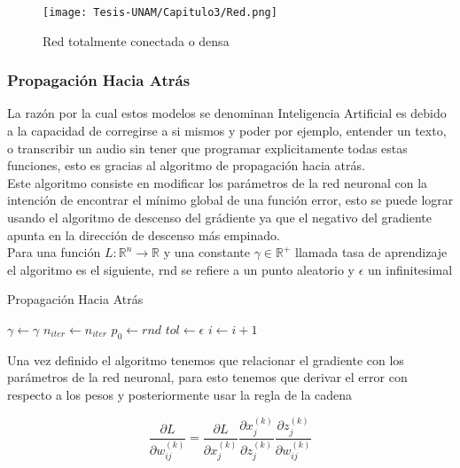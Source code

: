 \begin{figure}
    \centering
    \texttt{[image: Tesis-UNAM/Capitulo3/Red.png]}
    \caption{Red totalmente conectada o densa}
    \label{fig:enter-label}
\end{figure}

\subsubsection{Propagación Hacia Atrás}
La razón por la cual estos modelos se denominan Inteligencia Artificial es debido a la capacidad de corregirse a si mismos y poder por ejemplo, entender un texto, o transcribir un audio sin tener que programar explicitamente todas estas funciones, esto es gracias al algoritmo de propagación hacia atrás.\\

Este algoritmo consiste en modificar los parámetros de la red neuronal con la intención de encontrar el mínimo global de una función error, esto se puede lograr usando el algoritmo de descenso del grádiente ya que el negativo del gradiente apunta en la dirección de descenso más empinado.\\

Para una función $L:\mathbb{R}^n\xrightarrow{} \mathbb{R}$ y una constante $\gamma \in \mathbb{R}^+$ llamada tasa de aprendizaje el algoritmo es el siguiente, rnd se refiere a un punto aleatorio y $\epsilon$ un infinitesimal

\begin{algorithm}
    \caption{Propagación Hacia Atrás}\label{alg:cap}
    \begin{algorithmic}
    \State $\gamma \gets \gamma$
    \State $n_{iter} \gets n_{iter}$
    \State $p_0 \gets rnd$
    \State $tol \gets \epsilon$
        \State $i \gets i+1$
        \EndIf
        \EndWhile
    \end{algorithmic}
\end{algorithm}

Una vez definido el algoritmo tenemos que relacionar el gradiente con los parámetros de la red neuronal, para esto tenemos que derivar el error con respecto a los pesos y posteriormente usar la regla de la cadena \cite{Beyer}

\begin{equation}
    \frac{\partial L}{\partial w_{ij}^{(k)}} = \frac{\partial L}{\partial x_j^{(k)}}\frac{\partial x_j^{(k)}}{\partial z_j^{(k)}}
    \frac{\partial z_j^{(k)}}{\partial w_{ij}^{(k)}}
\end{equation}

